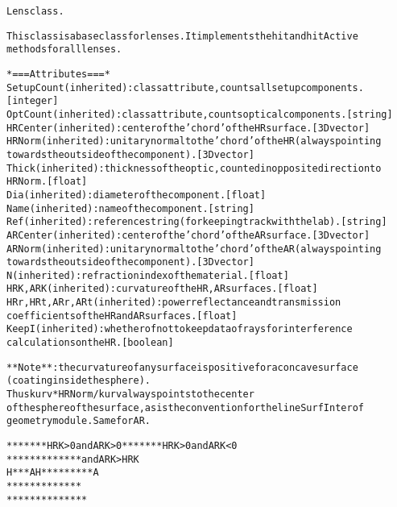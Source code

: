 \begin{alltt}


Lens class.

This class is a base class for lenses. It implements the hit and hitActive
methods for all lenses.

*=== Attributes ===*
SetupCount (inherited): class attribute, counts all setup components.
    [integer]
OptCount (inherited): class attribute, counts optical components. [string]
HRCenter (inherited): center of the 'chord' of the HR surface. [3D vector]
HRNorm (inherited): unitary normal to the 'chord' of the HR (always pointing
    towards the outside of the component). [3D vector]
Thick (inherited): thickness of the optic, counted in opposite direction to
    HRNorm. [float]
Dia (inherited): diameter of the component. [float]
Name (inherited): name of the component. [string]
Ref (inherited): reference string (for keeping track with the lab). [string]
ARCenter (inherited): center of the 'chord' of the AR surface. [3D vector]
ARNorm (inherited): unitary normal to the 'chord' of the AR (always pointing
    towards the outside of the component). [3D vector]
N (inherited): refraction index of the material. [float]
HRK, ARK (inherited): curvature of the HR, AR surfaces. [float]
HRr, HRt, ARr, ARt (inherited): power reflectance and transmission
    coefficients of the HR and AR surfaces. [float]
KeepI (inherited): whether of not to keep data of rays for interference
    calculations on the HR. [boolean]

**Note**: the curvature of any surface is positive for a concave surface
(coating inside the sphere).
Thus kurv*HRNorm/{\textbar}kurv{\textbar} always points to the center
of the sphere of the surface, as is the convention for the lineSurfInter of
geometry module. Same for AR.

*******     HRK {\textgreater} 0 and ARK {\textgreater} 0     *******           HRK {\textgreater} 0 and ARK {\textless} 0
 *****                               ********         and {\textbar}ARK{\textbar} {\textgreater} {\textbar}HRK{\textbar}
 H***A                               H*********A
 *****                               ********
*******                             *******
\end{alltt}



